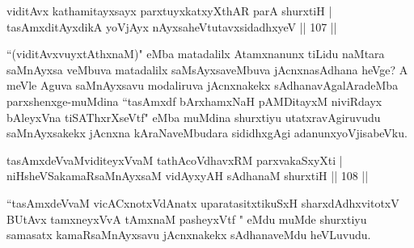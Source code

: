 



\begin{shl}
viditAvx kathamitayxsayx parxtuyxkatxyXthAR parA shurxtiH |\\
tasAmxditAyxdikA yoVjAyx nAyxsaheVtutavxsidadhxyeV \hfill || 107 ||
\end{shl}

\begin{artha}
``(viditAvxvuyxtAthxnaM)" eMba matadalilx Atamxnanunx tiLidu naMtara saMnAyxsa veMbuva matadalilx saMsAyxsaveMbuva jAcnxnasAdhana heVge? A meVle Aguva saMnAyxsavu modaliruva jAcnxnakekx sAdhanavAgalAradeMba parxshenxge-muMdina ``tasAmxdf bArxhamxNaH pAMDitayxM niviRdayx bAleyxVna tiSAThxrXseVtf" eMba muMdina shurxtiyu utatxravAgiruvudu saMnAyxsakekx jAcnxna kAraNaveMbudara sididhxgAgi adanunxyoVjisabeVku.
\end{artha}

\begin{shl}
tasAmxdeVvaMviditeyxVvaM tathAcoVdhavxRM parxvakaSxyXti |\\
niHsheVSakamaRsaMnAyxsaM vidAyxyAH sAdhanaM shurxtiH \hfill || 108 ||
\end{shl}

\begin{artha}
``tasAmxdeVvaM vicACxnotxVdAnatx uparatasitxtikuSxH sharxdAdhxvitotxV BUtAvx  tamxneyxVvA  tAmxnaM pasheyxVtf " eMdu muMde shurxtiyu samasatx kamaRsaMnAyxsavu jAcnxnakekx sAdhanaveMdu heVLuvudu. 
\end{artha}

